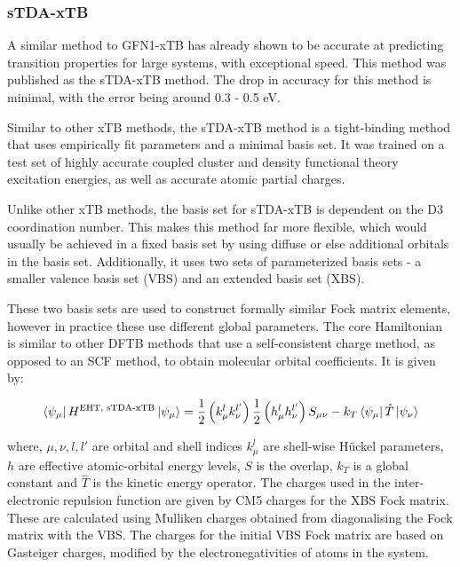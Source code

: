\subsubsection{sTDA-xTB}
\label{subsubsec:stda_xtb}
A similar method to GFN1-xTB has already shown to be accurate at predicting
transition properties for large systems, with exceptional speed. This method was
published as the sTDA-xTB method\cite{Grimme2016}. The drop in accuracy for this
method is minimal, with the error being around 0.3 - 0.5 eV.

Similar to other xTB methods, the sTDA-xTB method is a tight-binding method that
uses empirically fit parameters and a minimal basis set. It was trained on a
test set of highly accurate coupled cluster and density functional theory
excitation energies, as well as accurate atomic partial charges.

Unlike other xTB methods, the basis set for sTDA-xTB is dependent on the D3
coordination number. This makes this method far more flexible, which would usually
be achieved in a fixed basis set by using diffuse or else additional orbitals in
the basis set. Additionally, it uses two sets of parameterized basis sets - a
smaller valence basis set (VBS) and an extended basis set (XBS).

These two basis sets are used to construct formally similar Fock matrix elements,
however in practice these use different global parameters. The core Hamiltonian
is similar to other DFTB methods that use a self-consistent charge method, as
opposed to an SCF method, to obtain molecular orbital coefficients. It is given by:

\begin{equation}
\bra{\psi_\mu} H^{\text{EHT, sTDA-xTB}} \ket{\psi_\mu}= \frac{1}{2} \left(k^l_\mu k^{l'}_\nu\right) \frac{1}{2} \left(h^l_\mu h^{l'}_\nu\right) S_{\mu\nu} - k_T \bra{\psi_\mu}\hat{T}\ket{\psi_\nu}
\end{equation}

where, $\mu,\nu,l,l'$ are orbital and shell indices  $k^l_\mu$ are shell-wise 
H{\"u}ckel parameters, $h$ are effective atomic-orbital energy levels, $S$ is
the overlap, $k_T$ is a global constant and $\hat{T}$ is the kinetic energy 
operator. The charges used in the inter-electronic repulsion function are given 
by CM5 charges for the XBS Fock matrix. These are calculated using Mulliken 
charges obtained from diagonalising the Fock matrix with the VBS. The charges for 
the initial VBS Fock matrix are based on Gasteiger charges, modified by the 
electronegativities of atoms in the system.

